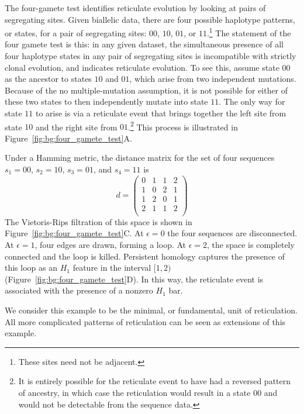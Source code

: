 The four-gamete test identifies reticulate evolution by looking at pairs of segregating sites.
Given biallelic data, there are four possible haplotype patterns, or states, for a pair of segregating sites: $00$, $10$, $01$, or $11$.\footnote{These sites need not be adjacent.}
The statement of the four gamete test is this: in any given dataset, the simultaneous presence of all four haplotype states in any pair of segregating sites is incompatible with strictly clonal evolution, and indicates reticulate evolution.
To see this, assume state $00$ as the ancestor to states $10$ and $01$, which arise from two independent mutations.
Because of the no multiple-mutation assumption, it is not possible for either of these two states to then independently mutate into state $11$.
The only way for state $11$ to arise is via a reticulate event that brings together the left site from state $10$ and the right site from $01$.\footnote{It is entirely possible for the reticulate event to have had a reversed pattern of ancestry, in which case the reticulation would result in a state $00$ and would not be detectable from the sequence data.}
This process is illustrated in Figure~\ref{fig:bg:four_gamete_test}A.

Under a Hamming metric, the distance matrix for the set of four sequences $s_1=00$, $s_2=10$, $s_3=01$, and $s_4=11$ is
\begin{equation}
d = 
\begin{pmatrix}
0 & 1 & 1 & 2 \\
1 & 0 & 2 & 1 \\
1 & 2 & 0 & 1 \\
2 & 1 & 1 & 2 \\
\end{pmatrix}
\end{equation}
The Vietoris-Rips filtration of this space is shown in Figure~\ref{fig:bg:four_gamete_test}C.
At $\epsilon=0$ the four sequences are disconnected.
At $\epsilon=1$, four edges are drawn, forming a loop.
At $\epsilon=2$, the space is completely connected and the loop is killed.
Persistent homology captures the presence of this loop as an $H_1$ feature in the interval $[1,2)$ (Figure~\ref{fig:bg:four_gamete_test}D).
In this way, the reticulate event is associated with the presence of a nonzero $H_1$ bar.

We consider this example to be the minimal, or fundamental, unit of reticulation.
All more complicated patterns of reticulation can be seen as extensions of this example.

